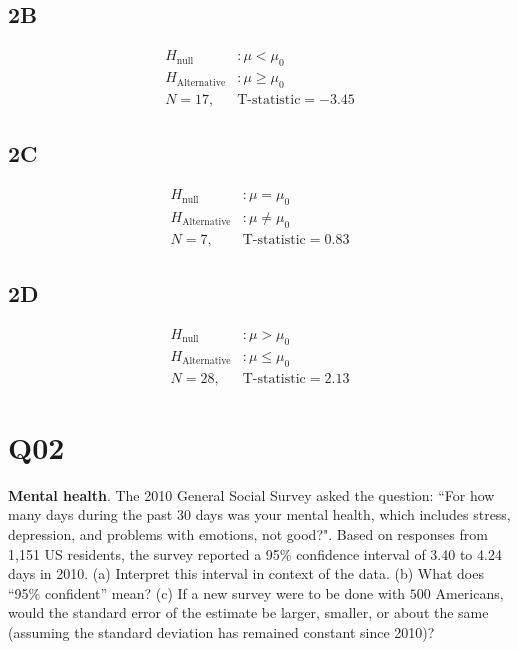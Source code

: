 \documentclass[11pt]{article}
\begin{document}
\subsection*{2B}

\begin{align*}
  H_{\text{null}}&: \mu < \mu_{0}\\
  H_{\text{Alternative}}&: \mu \ge \mu_{0}\\
  N = 17, \;  & \text{T-statistic} = -3.45
\end{align*}

\subsection*{2C}

\begin{align*}
  H_{\text{null}}&: \mu = \mu_{0}\\
  H_{\text{Alternative}}&: \mu \neq \mu_{0}\\
  N = 7, \;  & \text{T-statistic} = 0.83
\end{align*}

\subsection*{2D}

\begin{align*}
  H_{\text{null}}&: \mu > \mu_{0}\\
  H_{\text{Alternative}}&: \mu \le \mu_{0}\\
  N = 28, \;  & \text{T-statistic} = 2.13
\end{align*}


\section*{Q02}

\textbf{Mental health}. The 2010 General Social Survey asked the question: “For how many days during the past 30 days was your mental health, which includes stress, depression, and problems with emotions, not good?".
Based on responses from 1,151 US residents, the survey reported a 95\% confidence interval of 3.40 to 4.24 days in 2010.
(a) Interpret this interval in context of the data.
(b) What does ``95\% confident'' mean? 
(c) If a new survey were to be done with $500$ Americans, would the standard error of the estimate be larger,
smaller, or about the same (assuming the standard deviation has remained constant since 2010)?
\end{document}
